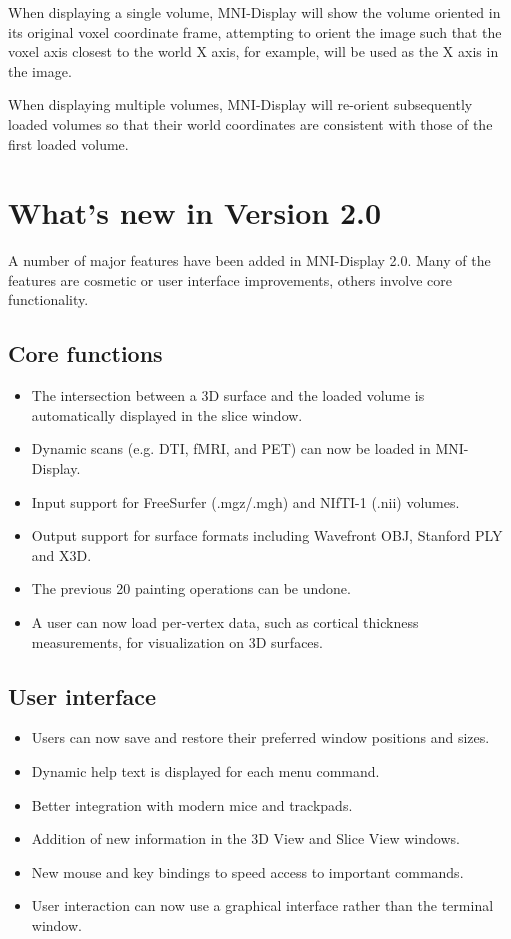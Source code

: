 \documentclass[11pt,letterpaper]{article}
\newcommand{\display}{\mbox{MNI-Display}}
\begin{document}
When displaying a single volume, \display{} will show the volume
oriented in its original voxel coordinate frame, attempting to orient
the image such that the voxel axis closest to the world X axis, for
example, will be used as the X axis in the image.

When displaying multiple volumes, \display{} will re-orient subsequently
loaded volumes so that their world coordinates are consistent with
those of the first loaded volume.

\section{What's new in Version 2.0}

A number of major features have been added in \display{} 2.0. Many of
the features are cosmetic or user interface improvements, others
involve core functionality.

\subsection{Core functions}
\begin{itemize}
\item The intersection between a 3D surface and the loaded volume is automatically displayed in the slice window.
\item Dynamic scans (e.g. DTI, fMRI, and PET) can now be loaded in \display{}.
\item Input support for FreeSurfer (.mgz/.mgh) and NIfTI-1 (.nii)
  volumes.
\item Output support for surface formats including Wavefront OBJ,
  Stanford PLY and X3D.
\item The previous 20 painting operations can be undone.
\item A user can now load per-vertex data, such as cortical thickness measurements, for visualization on 3D surfaces.
\end{itemize}

\subsection{User interface}
\begin{itemize}
\item Users can now save and restore their preferred window positions and sizes.
\item Dynamic help text is displayed for each menu command.
\item Better integration with modern mice and trackpads.
\item Addition of new information in the 3D View and Slice View windows.
\item New mouse and key bindings to speed access to important commands.
\item User interaction can now use a graphical interface rather than the
terminal window.
\end{itemize}
\end{document}
